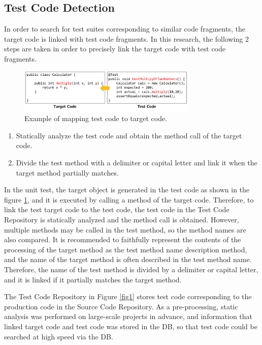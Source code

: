 \documentclass[conference]{IEEEtran}
\begin{document}
\subsection{Test Code Detection}
In order to search for test suites corresponding to similar code fragments, the target code is linked with test code fragments. In this research, the following 2 steps are taken in order to precisely link the target code with test code fragments.

\begin{figure}[htbp]
\centerline{\includegraphics[width=8.5cm]{mapping.pdf}}
\caption{Example of mapping test code to target code.}
\label{fig2}
\end{figure}

\begin{enumerate}
\renewcommand{\labelenumi}{(\arabic{enumi})}
\item Statically analyze the test code and obtain the method call of the target code.
\item Divide the test method with a delimiter or capital letter and link it when the target method partially matches.
\end{enumerate}

In the unit test, the target object is generated in the test code as shown in the figure \ref{fig2}, and it is executed by calling a method of the target code. Therefore, to link the test target code to the test code, the test code in the Test Code Repository is statically analyzed and the method call is obtained. However, multiple methods may be called in the test method, so the method names are also compared. It is recommended to faithfully represent the contents of the processing of the target method as the test method name description method, and the name of the target method is often described in the test method name\cite{b22}. Therefore, the name of the test method is divided by a delimiter or capital letter, and it is linked if it partially matches the target method.

The Test Code Repository in Figure \ref{fig1} stores test code corresponding to the production code in the Source Code Repository. As a pre-processing, static analysis was performed on large-scale projects in advance, and information that linked target code and test code was stored in the DB, so that test code could be searched at high speed via the DB.
\end{document}
